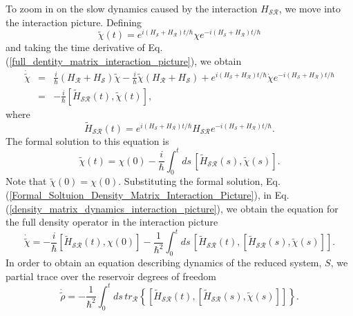 %
To zoom in on the slow dynamics caused by the interaction $H_{\mathcal{SR}}$, we move into the interaction picture. Defining 
\begin{equation}\label{full_dentity_matrix_interaction_picture}
\tilde{\chi}(t) = e^{i (H_{\mathcal{S}} + H_{\mathcal{R}})t/\hbar} \chi e^{- i (H_{\mathcal{S}} + H_{\mathcal{R}})t/\hbar}
\end{equation}
and taking the time derivative of Eq. (\ref{full_dentity_matrix_interaction_picture}), we obtain
\begin{eqnarray}\label{density_matrix_dynamics_interaction_picture}
\dot{\tilde{\chi} } & = & \frac{i}{\hbar} (H_{\mathcal{R}} + H_{\mathcal{S}} )\tilde{\chi} - \frac{i}{\hbar}\tilde{\chi} (H_{\mathcal{R}} + H_{\mathcal{S}} )+ e^{i (H_{\mathcal{S}} + H_{\mathcal{R}})t/\hbar} \dot{\chi} e^{- i (H_{\mathcal{S}} + H_{\mathcal{R}})t/\hbar} \nonumber \\
& =&  - \frac{i}{\hbar} [\tilde{H}_{\mathcal{SR}}(t) , \tilde{\chi}(t)],
\end{eqnarray}
where
\begin{equation}
\tilde{H}_{\mathcal{SR}}(t) = e^{i (H_{\mathcal{S}}+H_{\mathcal{R}})t/\hbar} H_{\mathcal{SR}} e^{-i (H_{\mathcal{S}}+H_{\mathcal{R}})t/\hbar}.
\end{equation}
The formal solution to this equation is
\begin{equation}\label{Formal_Soltuion_Density_Matrix_Interaction_Picture}
\tilde{\chi}(t) = \chi(0) - \frac{i}{\hbar} \int_0^t ds \, [\tilde{H}_{\mathcal{SR}}(s) , \tilde{\chi}(s)].
\end{equation}
Note that $\tilde{\chi}(0) = \chi(0)$. Substituting the formal solution, Eq. (\ref{Formal_Soltuion_Density_Matrix_Interaction_Picture}), in Eq. (\ref{density_matrix_dynamics_interaction_picture}), we obtain the equation for the full density operator in the interaction picture
\begin{equation}
\dot{\tilde{\chi}}  =  -\frac{i}{\hbar} [ \tilde{H}_{\mathcal{SR}}(t), \chi(0) ] - \frac{1}{\hbar^2} \int_0^t ds \, [\tilde{H}_{\mathcal{SR}}(t), [\tilde{H}_{\mathcal{SR}}(s), \tilde{\chi}(s)]].
\end{equation}
In order to obtain an equation describing dynamics of the reduced system, $S$, we partial trace over the reservoir degrees of freedom
\begin{equation}\label{Exact_density_matrix_dynamics}
\dot{\tilde{\rho}} =  - \frac{1}{\hbar^2} \int_0^t ds \,  tr_{\mathcal{R}} \left\lbrace [\tilde{H}_{\mathcal{SR}}(t), [\tilde{H}_{\mathcal{SR}}(s), \tilde{\chi}(s)]] \right\rbrace.
\end{equation}
